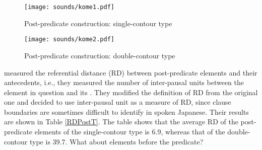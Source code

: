 \begin{figure}
	\begin{center}
	\texttt{[image: sounds/kome1.pdf]}
	\caption{Post-predicate construction: single-contour type}
	\label{kome1F}
	\end{center}
\end{figure}
\begin{figure}
	\begin{center}
	\texttt{[image: sounds/kome2.pdf]}
	\caption{Post-predicate construction: double-contour type}
	\label{kome2F}
	\end{center}
\end{figure}

 measured the referential distance (RD) between post-predicate elements and their antecedents,
i.e., they measured the number of inter-pausal units between the element in question and its .
They modified the definition of RD from the original one \cite{givon83} and decided to use inter-pausal unit as a measure of RD,
since clause boundaries are sometimes difficult to identify in spoken Japanese.
Their results are shown in Table \ref{RDPostT}.
The table shows that the average RD of the post-predicate elements of the single-contour type is 6.9,
whereas that of the double-contour type is 39.7.
What about elements before the predicate?

